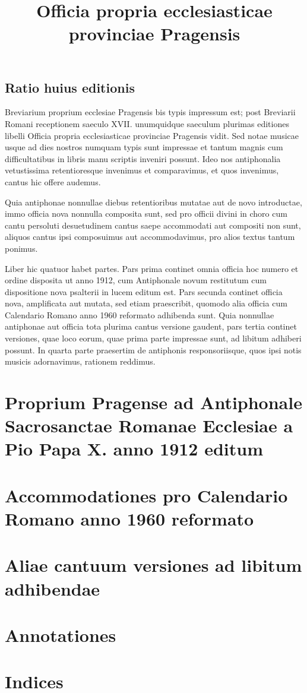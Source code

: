 \documentclass[12pt, a5paper, twoside]{book}
\title{Officia propria ecclesiasticae provinciae Pragensis}
\begin{document}
\setlength{\parindent}{0.5cm}

\maketitle

\chapter*{Ratio huius editionis}

Breviarium proprium ecclesiae Pragensis bis
typis impressum est; post Breviarii Romani receptionem
saeculo XVII. unumquidque saeculum plurimas editiones
libelli Officia propria ecclesiasticae provinciae Pragensis vidit.
Sed notae musicae usque ad dies nostros numquam typis sunt impressae
et tantum magnis cum difficultatibus in libris manu scriptis
inveniri possunt. Ideo nos antiphonalia vetustissima retentioresque
invenimus et comparavimus, et quos invenimus, cantus hic offere
audemus.

Quia antiphonae nonnullae diebus retentioribus mutatae aut de novo
introductae, immo officia nova nonnulla composita sunt,
sed pro officii divini in choro cum cantu persoluti desuetudinem
cantus saepe accommodati aut compositi non sunt,
aliquos cantus ipsi composuimus aut accommodavimus, pro alios
textus tantum ponimus.

Liber hic quatuor habet partes.
Pars prima continet omnia officia hoc numero et ordine disposita
ut anno 1912, cum Antiphonale novum restitutum
cum dispositione nova psalterii in lucem editum est.
Pars secunda continet officia nova, amplificata aut mutata,
sed etiam praescribit, quomodo alia officia cum
Calendario Romano anno 1960 reformato adhibenda sunt.
Quia nonnullae antiphonae aut officia tota plurima cantus versione
gaudent, pars tertia continet versiones, quae loco eorum,
quae prima parte impressae sunt, ad libitum adhiberi possunt.
In quarta parte praesertim de antiphonis responsoriisque,
quos ipsi notis musicis adornavimus, rationem reddimus.

\part{Proprium Pragense ad Antiphonale Sacrosanctae Romanae Ecclesiae
  a Pio Papa X. anno 1912 editum}

\part{Accommodationes pro Calendario Romano anno 1960 reformato}

\part{Aliae cantuum versiones ad libitum adhibendae}

\part{Annotationes}

\part{Indices}

\end{document}
